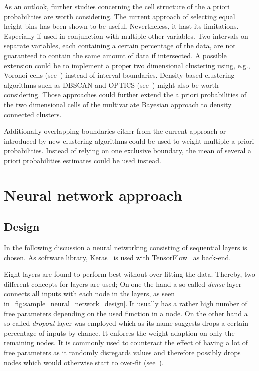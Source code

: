 As an outlook, further studies concerning the cell structure of the a priori probabilities are worth considering. The current approach of selecting equal height bins has been shown to be useful. Nevertheless, it hast its limitations. Especially if used in conjunction with multiple other variables. Two intervals on separate variables, each containing a certain percentage of the data, are not guaranteed to contain the same amount of data if intersected. A possible extension could be to implement a proper two dimensional clustering using, e.g., Voronoi cells (see~\cite{KnowledgeDiscoveryInDatabases1:Clustering}) instead of interval boundaries. Density based clustering algorithms such as DBSCAN and OPTICS (see~\cite{KnowledgeDiscoveryInDatabases1:Clustering}) might also be worth considering. Those approaches could further extend the a priori probabilities of the two dimensional cells of the multivariate Bayesian approach to density connected clusters.

Additionally overlapping boundaries either from the current approach or introduced by new clustering algorithms could be used to weight multiple a priori probabilities. Instead of relying on one exclusive boundary, the mean of several a priori probabilities estimates could be used instead.

\section{Neural network approach}
\label{sec:neural_network_approach}

\subsection{Design}
\label{subsec:neural_network_design}

In the following discussion a neural networking consisting of sequential layers is chosen. As software library, Keras~\cite{chollet2015keras} is used with TensorFlow~\cite{tensorflow2015-whitepaper} as back-end.

Eight layers are found to perform best without over-fitting the data. Thereby, two different concepts for layers are used; On one the hand a so called \textit{dense} layer connects all inputs with each node in the layers, as seen in~\autoref{fig:sample_neural_network_design}. It usually has a rather high number of free parameters depending on the used function in a node. On the other hand a so called \textit{dropout} layer was employed which as its name suggests drops a certain percentage of inputs by chance. It enforces the weight adaption on only the remaining nodes. It is commonly used to counteract the effect of having a lot of free parameters as it randomly disregards values and therefore possibly drops nodes which would otherwise start to over-fit (see~\cite{MachineLearning:DeepLearning}).

